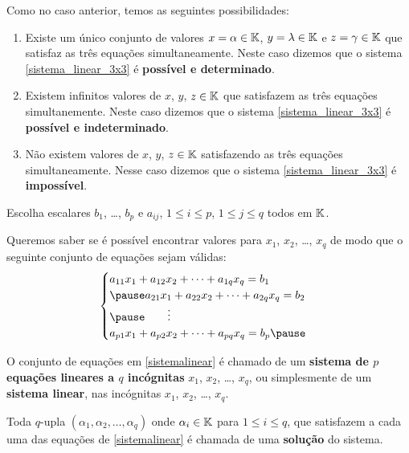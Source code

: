 \documentclass{beamer}
\begin{document}
    \begin{frame}
        Como no caso anterior, temos as seguintes possibilidades:\pause
        \begin{enumerate}[label={\roman*})]
            \item Existe um único conjunto de valores $x = \alpha \in \mathbb{K}$, $y = \lambda \in \mathbb{K}$ e $z = \gamma \in \mathbb{K}$ \pause que satisfaz as três equações simultaneamente. \pause Neste caso dizemos que o sistema \eqref{sistema_linear_3x3} \pause é \textbf{possível e determinado}.\pause

            \item Existem infinitos valores de $x$, $y$, $z \in \mathbb{K}$ \pause que satisfazem as três equações simultanemente. \pause Neste caso dizemos que o sistema \eqref{sistema_linear_3x3} \pause é \textbf{possível e indeterminado}.\pause

            \item Não existem valores de $x$, $y$, $z \in \mathbb{K}$ \pause satisfazendo as três equações simultaneamente. \pause Nesse caso dizemos que o sistema \eqref{sistema_linear_3x3} \pause é \textbf{impossível}.
        \end{enumerate}
    \end{frame}

    \begin{frame}

        Escolha escalares $b_1$, \dots, $b_p$ \pause e $a_{ij}$, \pause $1 \le i \le p$, $1 \le j \le q$ todos em $\mathbb{K}$.

        Queremos saber se é possível encontrar valores para  $x_1$, $x_2$, \dots, $x_q$ \pause de modo que o seguinte conjunto de equações sejam válidas: \pause
        \begin{equation}\label{sistemalinear}\index{Sistema Linear}
	    \begin{cases}
                a_{11}x_1 + a_{12}x_2 + \cdots + a_{1q}x_q = b_1\\\pause
                a_{21}x_1 + a_{22}x_2 + \cdots + a_{2q}x_q = b_2\\\pause
                \qquad \vdots\\
                a_{p1}x_1 + a_{p2}x_2 + \cdots + a_{pq}x_q = b_p\pause
            \end{cases}
        \end{equation}
        
        O conjunto de equações em \eqref{sistemalinear} é chamado de um \pause \textbf{sistema de $p$ equa\c{c}\~oes lineares \pause a $q$ inc\'ognitas} $x_1$, $x_2$, \dots, $x_q$\pause , ou simplesmente de um \textbf{sistema linear}, nas incógnitas \pause $x_1$, $x_2$, \dots, $x_q$.\pause

        \vspace{.3cm}

        Toda $q$-upla $(\alpha_1, \alpha_2, \dots, \alpha_q)$ \pause onde $\alpha_i \in \mathbb{K}$ para $1 \le i \le q$, \pause que satisfazem a cada uma das equa\c{c}\~oes de \eqref{sistemalinear} \pause \'e chamada de uma \textbf{solu\c{c}\~ao} do sistema.
    \end{frame}
\end{document}
